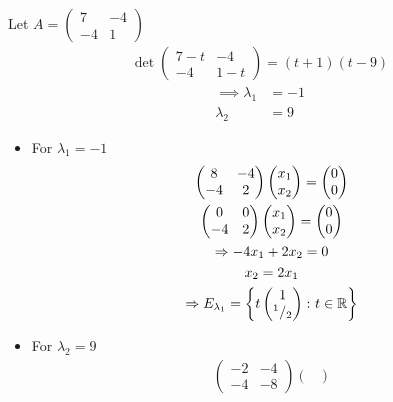 \begin{enumerate}
Let $A = \begin{pmatrix}
7 & -4\\
-4 & 1
\end{pmatrix}$
\begin{gather}
\det{
\begin{pmatrix}
7-t & -4\\
-4 & 1-t 
\end{pmatrix}
} = (t+1)(t-9)
\end{gather}
\begin{align}
\implies \lambda_1 &= -1\\
\lambda_2 &= 9
\end{align}
\begin{itemize}
\item For $\lambda_1 = -1$
\begin{gather}
\begin{pmatrix}
8 & -4\\
-4 & 2
\end{pmatrix}
\begin{pmatrix}
x_1\\x_2
\end{pmatrix}
=
\begin{pmatrix}
0\\0
\end{pmatrix}\\
\begin{pmatrix}
0 & 0\\
-4 & 2
\end{pmatrix}
\begin{pmatrix}
x_1\\x_2
\end{pmatrix}
=
\begin{pmatrix}
0\\0
\end{pmatrix}\\
\Rightarrow -4x_1 + 2x_2 =0 \\
x_2 = 2x_1\\
\Rightarrow E_{\lambda_1} = \left\{
t\begin{pmatrix}1\\^{1}/_{2}
\end{pmatrix}\colon t \in \mathbb{R}
\right\}
\end{gather}
\item For $\lambda_2 = 9$ 
\begin{gather}
\begin{pmatrix}
-2 & -4\\
-4 & -8
\end{pmatrix}
\begin{pmatrix}

\end{pmatrix}
\end{gather}
\end{itemize}
\end{enumerate}
